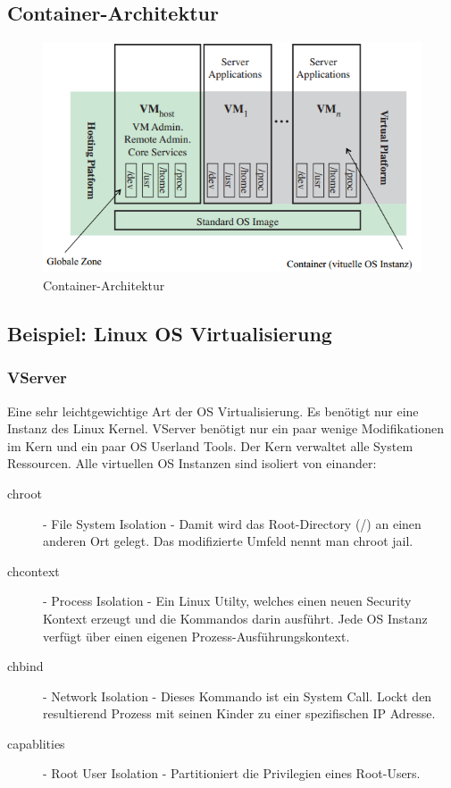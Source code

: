 \subsection{Container-Architektur}
\begin{figure}[h!]
\centering
\includegraphics[width=0.7\linewidth]{fig/container-architektur}
\caption{Container-Architektur}
\label{fig:container-architektur}
\end{figure}

\subsection{Beispiel: Linux OS Virtualisierung}
\subsubsection{VServer}
Eine sehr leichtgewichtige Art der OS Virtualisierung. Es benötigt nur eine Instanz des Linux Kernel. VServer benötigt nur ein paar wenige Modifikationen im Kern und ein paar OS Userland Tools. Der Kern verwaltet alle System Ressourcen. Alle virtuellen OS Instanzen sind isoliert von einander:
\begin{description}
	\item[chroot] - File System Isolation - Damit wird das Root-Directory (/) an einen anderen Ort gelegt. Das modifizierte Umfeld nennt man chroot jail.
	\item[chcontext] - Process Isolation - Ein Linux Utilty, welches einen neuen Security Kontext erzeugt und die Kommandos darin ausführt. Jede OS Instanz verfügt über einen eigenen Prozess-Ausführungskontext.
	\item[chbind] - Network Isolation - Dieses Kommando ist ein System Call. Lockt den resultierend Prozess mit seinen Kinder zu einer spezifischen IP Adresse.
	\item[capablities] - Root User Isolation - Partitioniert die Privilegien eines Root-Users. 
\end{description}

